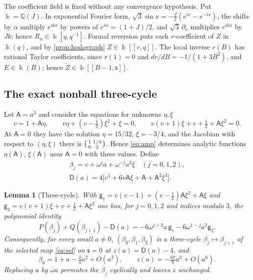 \documentclass[11pt]{amsart}
\numberwithin{equation}{section}
\newtheorem{lemma}[theorem]{Lemma}
\theoremstyle{definition}
\theoremstyle{remark}
\newcommand{\Q}{\mathbb{Q}}
\newcommand{\kk}{\Bbbk}
\newcommand{\sA}{\mathsf A}
\newcommand{\sD}{\mathsf D}
\newcommand{\ssf}{\mathsf s}
\begin{document}
The coefficient field is fixed without any convergence hypothesis. Put $\kk=\Q(J)$. In exponential Fourier form, $\sqrt3\sin x=-\frac J2(e^{ix}-e^{-ix})$, the shifts by $\alpha$ multiply $e^{ikx}$ by powers of $e^{i\alpha}=(1+J)/2$, and $\sqrt3\,\partial_x$ multiplies $e^{ikx}$ by $Jk$; hence $R_n\in\kk[q,q^{-1}]$. Formal reversion puts each $r$-coefficient of $Z$ in $\kk(q)$, and by \cref{prop:hodograph} $Z\in\kk[[r,q]]$. The local inverse $r(B)$ has rational Taylor coefficients, since $r(1)=0$ and $dr/dB=-1/(1+3B^2)$, and $E\in\kk(B)$; hence $\widetilde Z\in\kk[[B-1,\ssf]]$.

\subsection{The exact nonball three-cycle}
Let $\sA=a^3$ and consider the equations for unknowns $\eta,\xi$
\begin{equation}\label{eq:amp}
v=1+\sA\eta,\qquad v\eta+(v-\tfrac12)\xi^2+\xi=0,\qquad v(v+1)\xi+v+\tfrac12+\sA\xi^2=0 .
\end{equation}
At $\sA=0$ they have the solution $\eta=15/32$, $\xi=-3/4$, and the Jacobian with respect to $(\eta,\xi)$ there is $\begin{psmallmatrix}1&1/4\\0&2\end{psmallmatrix}$. Hence \eqref{eq:amp} determines analytic functions $\eta(\sA)$, $\xi(\sA)$ near $\sA=0$ with these values. Define
\begin{equation}\label{eq:cycle}
\begin{gathered}
\beta_j=v+\omega^ja+\omega^{-j}a^2\xi\quad(j=0,1,2),\\
\sD(a)=4\bigl[v^3+6v\sA\xi+\sA+\sA^2\xi^3\bigr].
\end{gathered}
\end{equation}

\begin{lemma}[Three-cycle]\label{lem:cycle}
With $\mathsf g_1=v(v-1)+(v-\frac12)\sA\xi^2+\sA\xi$ and $\mathsf g_2=v(v+1)\xi+v+\frac12+\sA\xi^2$ one has, for $j=0,1,2$ and indices modulo $3$, the polynomial identity
\[
P(\beta_j)+Q(\beta_{j+1})-\sD(a)=-6\omega^{j+2}a\,\mathsf g_1-6\omega^{1-j}a^2\mathsf g_2 .
\]
Consequently, for every small $a\ne0$, $(\beta_0,\beta_1,\beta_2)$ is a three-cycle $\beta_j\mapsto\beta_{j+1}$ of the selected map \eqref{eq:sel} on $\ssf=0$ at $z(a)=\sD(a)-4$, and
\begin{equation}\label{eq:lead}
\beta_0=1+a-\tfrac34a^2+O(a^3),\qquad z(a)=-\tfrac{67}8a^3+O(a^6).
\end{equation}
Replacing $a$ by $\omega a$ permutes the $\beta_j$ cyclically and leaves $z$ unchanged.
\end{lemma}
\end{document}

